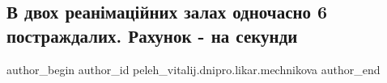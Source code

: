  
 
 
 
 

\subsection{В двох реанімаційних залах одночасно 6 постраждалих. Рахунок - на секунди}
\label{sec:15_01_2023.fb.peleh_vitalij.dnipro.likar.mechnikova.1.v_dvokh_rean_mats_in}

\ifcmt
 author_begin
   author_id peleh_vitalij.dnipro.likar.mechnikova
 author_end
\fi
